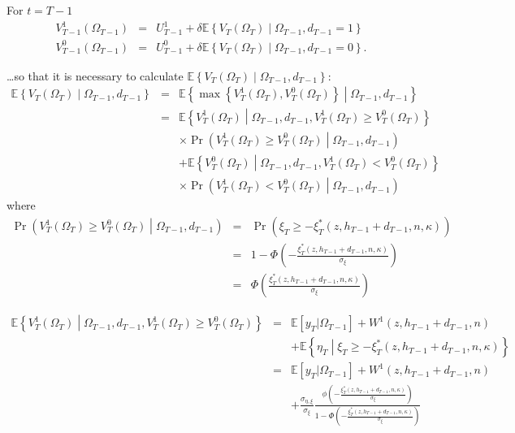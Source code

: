 \indent For $t = T-1$
\begin{eqnarray}
V^{1}_{T-1}\left(\Omega_{T-1}\right) &=& U^{1}_{T-1} + 
\delta \mathbb{E} \left\{ V_T\left(\Omega_T\right) \middle| \Omega_{T-1}, d_{T-1}=1\right\} \\
V^{0}_{T-1}\left(\Omega_{T-1}\right) &=& U^{0}_{T-1} + 
\delta \mathbb{E} \left\{ V_T\left(\Omega_T\right) \middle| \Omega_{T-1}, d_{T-1}=0\right\}.
\end{eqnarray}

\noindent \ldots so that it is necessary to calculate $\mathbb{E} \left\{ V_T\left(\Omega_T\right) \middle| \Omega_{T-1}, d_{T-1}\right\}$:
\begin{eqnarray}
\mathbb{E} \left\{ V_T\left(\Omega_T\right) \middle| \Omega_{T-1}, d_{T-1}\right\} &=& \mathbb{E} \left\{ \max\left\{ V^{1}_T\left(\Omega_T\right), V^{0}_T\left(\Omega_T\right) \right\} \middle| \Omega_{T-1}, d_{T-1} \right\} \nonumber \\
&=& \mathbb{E} \left\{ V^{1}_T\left(\Omega_T\right) \middle| \Omega_{T-1}, d_{T-1}, V^{1}_T\left(\Omega_T\right) \geq V^{0}_T\left(\Omega_T\right) \right\} \nonumber \\
& & \times \Pr\left(V^1_T\left(\Omega_T\right) \geq V^0_T\left(\Omega_T\right) \middle| \Omega_{T-1}, d_{T-1} \right) \nonumber \\
& & + \mathbb{E} \left\{ V^{0}_T\left(\Omega_T\right) \middle| \Omega_{T-1}, d_{T-1}, V^{1}_T\left(\Omega_T\right) < V^{0}_T\left(\Omega_T\right) \right\} \nonumber \\
& & \times \Pr\left(V^1_T\left(\Omega_T\right) < V^0_T\left(\Omega_T\right) \middle| \Omega_{T-1}, d_{T-1} \right)
\end{eqnarray}
\noindent where
\begin{eqnarray}
\Pr\left(V^1_T\left(\Omega_T\right) \geq V^0_T\left(\Omega_T\right) \middle| \Omega_{T-1}, d_{T-1} \right) &=& \Pr\left(\xi_T \geq - \xi^*_T\left(z, h_{T-1}+d_{T-1},n,\kappa\right)\right) \nonumber \\
&=& 1 - \Phi\left( -\frac{\xi^*_T\left(z,h_{T-1}+d_{T-1},n,\kappa\right)}{\sigma_\xi}\right) \nonumber \\
&=& \Phi\left( \frac{\xi^*_T\left(z,h_{T-1}+d_{T-1},n,\kappa\right)}{\sigma_\xi}\right)
\end{eqnarray}

\begin{eqnarray}
\mathbb{E} \left\{ V^{1}_T\left(\Omega_T\right) \middle| \Omega_{T-1}, d_{T-1}, V^{1}_T\left(\Omega_T\right) \geq V^{0}_T\left(\Omega_T\right) \right\} &=& \mathbb{E} [y_T | \Omega_{T-1}] + W^1\left( z,h_{T-1}+d_{T-1},n\right) \nonumber \\
& & +\mathbb{E} \left\{\eta_T \middle| \xi_T \geq - \xi^*_T\left( z, h_{T-1}+d_{T-1}, n, \kappa \right)\right\} \nonumber \\
&=& \mathbb{E} [y_T | \Omega_{T-1}] + W^1\left( z,h_{T-1}+d_{T-1},n \right) \nonumber \\
& & +  \frac{\sigma_{\eta, \xi}}{\sigma_\xi} \frac{\phi\left(-\frac{\xi^*_T\left(z,h_{T-1}+d_{T-1},n,\kappa\right)}{\sigma_\xi}\right)}{1-\Phi\left(-\frac{\xi^*_T\left(z,h_{T-1}+d_{T-1},n,\kappa\right)}{\sigma_\xi}\right)}
\end{eqnarray}

